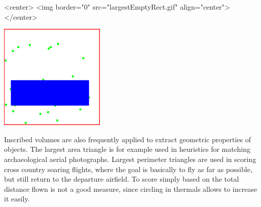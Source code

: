 \begin{ccHtmlOnly}
<center>
<img border="0" src="largestEmptyRect.gif" align="center">
</center>
\end{ccHtmlOnly} 

\begin{ccTexOnly}
\begin{center}
\includegraphics[width=5cm]{Inscribed_areas/largestEmptyRect}
\end{center}
\end{ccTexOnly}

Inscribed volumes are also frequently applied to extract
geometric properties of objects. The largest area triangle is for example used in
heuristics for matching archaeological aerial photographs. Largest
perimeter triangles are used in scoring cross country soaring flights,
where the goal is basically to fly as far as possible, but still
return to the departure airfield. To score simply based on the total
distance flown is not a good measure, since circling in thermals
allows to increase it easily.



